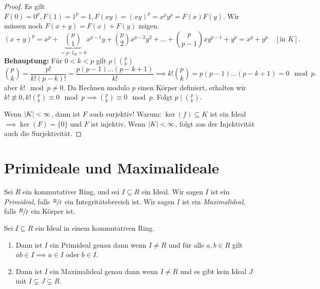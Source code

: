 \begin{proof}
	Es gilt $F(0) = 0^{p}, F(1) = 1^{p} = 1, F(xy) = (xy)^{p} = x^{p} y^{p} = F(x) F(y)$.
	Wir müssen noch $F(x+y) = F(x) + F(y)$ zeigen.
	\[
		(x+y)^{p} = x^{p} + \underbrace{\binom{p}{1}}_{=p\cdot 1_{K} = 0} x^{p-1} y + \binom{p}{2} x^{p-2} y^2 + \ldots + \binom{p}{p-1} x y^{p-1} + y^{p} = x^{p} + y^{p} 
		\quad [\text{in } K]
	.\] 
	\textbf{Behauptung:} Für $0 < k < p$ gilt $p \mid \binom{p}{k}$ 
	\[
		\binom{p}{k} = \frac{p!}{k! (p-k)!} = \frac{p (p-1) \ldots (p-k+1)}{k!} \implies k! \binom{p}{k} = p (p-1) \ldots (p-k+1) = 0 \mod p
	.\]
	aber $k! \mod p \neq 0$. Da Rechnen modulo $p$ einen Körper definiert, erhalten wir $k! \not\equiv 0, k! \binom{p}{k} \equiv 0 \mod p \implies \binom{p}{k} \equiv 0 \mod p$.
	Folgt $p \mid \binom{p}{k}$.

	Wenn $\abs{K} < \infty$, dann ist $F $ auch surjektiv!
	Warum: $\ker(f) \subseteq K$ ist ein Ideal $\implies \ker(F) = \{0\}$ und $F$ ist injektiv.
	Wenn $\abs{K} < \infty$, folgt aus der Injektivität auch die Surjektivität.
\end{proof}

\section{Primideale und Maximalideale}
\begin{definition}
	Sei $R$ ein kommutativer Ring, und sei $I \subseteq R$ ein Ideal.
	Wir sagen $I$ ist ein \emph{Primideal}, falls $\sfrac{R}{I}$ ein Integritätsbereich ist.
	Wir sagen $I$ ist ein \emph{Maximalideal}, falls $\sfrac{R}{I}$ ein Körper ist.
\end{definition}

\begin{proposition}
	Sei $I \subseteq R$ ein Ideal in einem kommutativen Ring.
	\begin{enumerate}[1)]
		\item Dann ist $I$ ein Primideal genau dann wenn $I \neq R$ und für alle $a,b \in R$ gilt $ab \in I \implies a \in I $ oder $b \in I$.
		\item Dann ist $I$ ein Maximalideal genau dann wenn $I \neq R$ und es gibt kein Ideal $J$ mit $I \subsetneq J \subsetneq R$.
	\end{enumerate}
\end{proposition}

